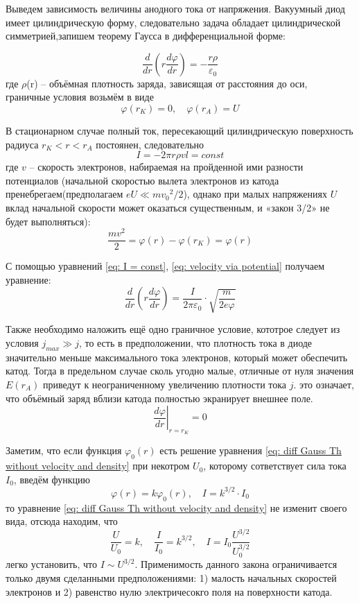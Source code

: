 \documentclass[a4paper,12pt]{article}
\begin{document}
Выведем зависимость величины анодного тока от напряжения. Вакуумный диод имеет цилиндрическую форму, следовательно задача обладает цилиндрической симметрией,запишем теорему Гаусса в дифференциальной форме:

\begin{equation}\label{eq: diff Gauss Th}
    \frac{d}{dr}(r\frac{d\varphi}{dr}) = -\frac{r\rho}{\varepsilon_0}
\end{equation}
где $\rho$(r) -- объёмная плотность заряда, зависящая от расстояния до оси, граничные условия возьмём в виде 
\begin{equation}\label{eq: granich uslovia}
    \varphi (r_K) = 0,\quad  \varphi (r_A) = U
\end{equation}

В стационарном случае полный ток, пересекающий
цилиндрическую поверхность радиуса $r_K < r < r_A$ постоянен, следовательно
\begin{equation}\label{eq: I = const}
    I = -2\pi r\rho v l = const
\end{equation}
где $v$ -- скорость электронов, набираемая на пройденной ими разности потенциалов (начальной скоростью вылета электронов из катода пренебрегаем(предполагаем $eU\ll m{v_0}^2 / 2$), однако при малых напряжениях $U$ вклад начальной скорости может оказаться существенным, и  «закон 3/2» не будет выполняться):
\begin{equation}\label{eq: velocity via potential}
    \frac{mv^2}{2} = \varphi (r) - \varphi (r_K) =  \varphi (r)
\end{equation}

С помощью уравнений \eqref{eq: I = const}, \eqref{eq: velocity via potential} получаем уравнение:
\begin{equation}\label{eq: diff Gauss Th without velocity and density}
    \frac{d}{dr}(r\frac{d\varphi}{dr}) = \frac{I}{2\pi \varepsilon_0} \cdot\sqrt{\frac{m}{2e\varphi}}
\end{equation}

Также необходимо наложить ещё одно граничное условие, кототрое следует из условия $j_{max} \gg j$, то есть в предположении, что плотность тока в диоде значительно меньше максимального тока электронов, который может обеспечить катод. Тогда в предельном случае сколь угодно малые, отличные от нуля значения $E(r_A)$ приведут к неограниченному увеличению плотности тока $j$. это означает, что объёмный заряд вблизи катода полностью экранирует внешнее поле.
\[\left.\frac{d\varphi}{dr}\right|_{r = r_K}^{} = 0\]

Заметим, что если функция $\varphi_0(r)$ есть решение уравнения \eqref{eq: diff Gauss Th without velocity and density} при некотром $U_0$, которому сответствует сила тока $I_0$, введём функцию 
\[\varphi (r) = k\varphi_0 (r), \quad I = k^{3/2}\cdot I_0 \]
то уравнение \eqref{eq: diff Gauss Th without velocity and density} не изменит своего вида, отсюда находим, что 
\[\frac{U}{U_0} = k, \quad \frac{I}{I_0} = k^{3 / 2}, \quad I = I_0 \frac{U^{3/2}}{U_0^{3/2}}\]
легко установить, что $I \sim U^{3/2}$. Применимость данного закона ограничивается только двумя сделанными предположениями: 1) малость начальных скоростей электронов и 2) равенство нулю электричесокго поля на поверхности катода.
\end{document}
